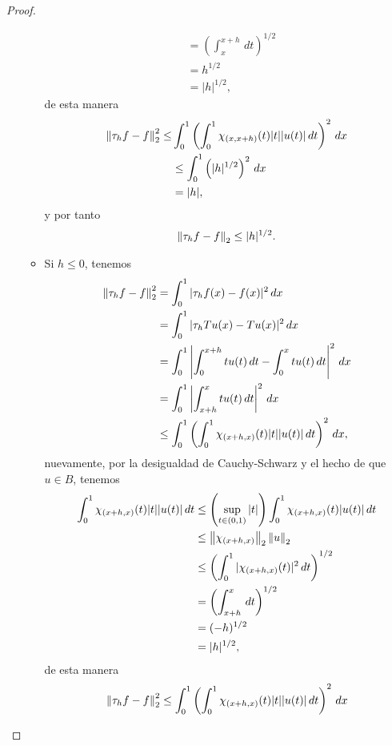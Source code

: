 \begin{proof}
\begin{enumerate}
\begin{itemize}
\begin{align*}
                &=\left(\int_x^{x+h}\, dt\right)^{1/2}\\
                &=h^{1/2}\\
                &=|h|^{1/2},
            \end{align*}
            de esta manera
            \begin{align*}
                \left\|\tau_hf-f\right\|_2^2\leq &\int_0^1 \left(\int_0^1 \chi_{(x,x+h)}(t)|t||u(t)|\, dt\right)^2\, dx\\
                &\leq \int_0^1 \left(|h|^{1/2}\right)^2\, dx\\
                &=|h|,
            \end{align*}
            y por tanto
            \begin{align*}
                \left\|\tau_hf-f\right\|_2\leq |h|^{1/2}.
            \end{align*}
            \item Si $h\leq 0$, tenemos
            \begin{align*}
                \left\|\tau_h f-f\right\|_2^2&=\int_0^1 |\tau_hf(x)-f(x)|^2\, dx\\
                &=\int_0^1|\tau_h Tu(x)-Tu(x)|^2\, dx\\
                &=\int_0^1 \left|\int_0^{x+h}tu(t)\, dt-\int_0^x tu(t)\, dt\right|^2\, dx\\
                &=\int_0^1 \left|\int_{x+h}^xtu(t)\, dt\right|^2\, dx\\
                &\leq \int_0^1\left(\int_0^1 \chi_{(x+h,x)}(t)|t||u(t)|\, dt\right)^2\, dx,
            \end{align*}
            nuevamente, por la desigualdad de Cauchy-Schwarz y el hecho de que $u \in B$, tenemos
            \begin{align*}
                \int_0^1 \chi_{(x+h,x)}(t)|t||u(t)|\, dt&\leq \left(\sup_{t \in (0,1)}|t|\right)\int_0^1 \chi_{(x+h,x)}(t)|u(t)|\, dt\\
                &\leq \left\|\chi_{(x+h,x)}\right\|_2\left\|u\right\|_2\\
                &\leq \left(\int_0^1 |\chi_{(x+h,x)}(t)|^2\, dt\right)^{1/2}\\
                &=\left(\int_{x+h}^x \, dt\right)^{1/2}\\
                &=(-h)^{1/2}\\
                &=|h|^{1/2},
            \end{align*}
            de esta manera
            \begin{align*}
                \norm{\tau_hf-f}_2^2&\leq  \int_0^1\left(\int_0^1 \chi_{(x+h,x)}(t)|t||u(t)|\, dt\right)^2\, dx\\

\end{align*}
\end{itemize}
\end{enumerate}
\end{proof}
